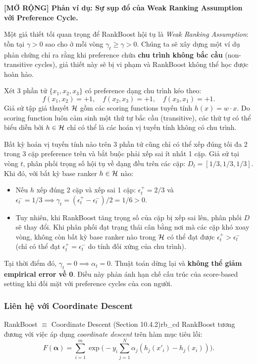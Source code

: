 \begin{morong}
\textbf{[MỞ RỘNG] Phản ví dụ: Sự sụp đổ của Weak Ranking Assumption với Preference Cycle.}

Một giả thiết tối quan trọng để RankBoost hội tụ là \textit{Weak Ranking Assumption}: tồn tại $\gamma > 0$ sao cho ở mỗi vòng $\gamma_t \geq \gamma > 0$. Chúng ta sẽ xây dựng một ví dụ phản chứng chỉ ra rằng khi preference chứa \textbf{chu trình không bắc cầu} (non-transitive cycles), giả thiết này sẽ bị vi phạm và RankBoost không thể học được hoàn hảo.

Xét 3 phần tử $\{x_1, x_2, x_3\}$ có preference dạng chu trình kéo theo:
\[
    f(x_1, x_2) = +1, \quad f(x_2, x_3) = +1, \quad f(x_3, x_1) = +1.
\]
Giả sử tập giả thuyết $\mathcal{H}$ gồm các scoring functions tuyến tính $h(x) = w \cdot x$. Do scoring function luôn cảm sinh một thứ tự bắc cầu (transitive), các thứ tự có thể biểu diễn bởi $h \in \mathcal{H}$ chỉ có thể là các hoán vị tuyến tính không có chu trình. 

Bất kỳ hoán vị tuyến tính nào trên 3 phần tử cũng chỉ có thể xếp đúng tối đa 2 trong 3 cặp preference trên và bắt buộc phải xếp sai ít nhất 1 cặp.
Giả sử tại vòng $t$, phân phối trọng số hội tụ về dạng đều trên các cặp: $D_t = [1/3, 1/3, 1/3]$. Khi đó, với bất kỳ base ranker $h \in \mathcal{H}$ nào:
\begin{itemize}
    \item Nếu $h$ xếp đúng 2 cặp và xếp sai 1 cặp: $\epsilon^+_t = 2/3$ và $\epsilon^-_t = 1/3 \implies \gamma_t = (\epsilon^+_t - \epsilon^-_t)/2 = 1/6 > 0$.
    \item Tuy nhiên, khi RankBoost tăng trọng số của cặp bị xếp sai lên, phân phối $D$ sẽ thay đổi. Khi phân phối đạt trạng thái cân bằng nơi mà các cặp khó xoay vòng, không còn bất kỳ base ranker nào trong $\mathcal{H}$ có thể đạt được $\epsilon^+_t > \epsilon^-_t$ (chỉ có thể đạt $\epsilon^+_t = \epsilon^-_t$ do tính đối xứng của chu trình).
\end{itemize}
Tại thời điểm đó, $\gamma_t = 0 \implies \alpha_t = 0$. Thuật toán dừng lại và \textbf{không thể giảm empirical error về 0}. Điều này phản ánh hạn chế cấu trúc của score-based setting khi đối mặt với preference cycles của con người.
\end{morong}

\subsubsection{Liên hệ với Coordinate Descent}

\begin{theorem}{RankBoost $\equiv$ Coordinate Descent (Section 10.4.2)}{rb_cd}
RankBoost tương đương với việc áp dụng \textit{coordinate descent} trên hàm mục tiêu lồi:
\begin{equation}
    F(\bm{\alpha}) = \sum_{i=1}^m \exp\Biggl(-y_i \sum_{j=1}^N \alpha_j (h_j(x'_i) - h_j(x_i))\Biggr).
    \label{eq:F_obj}
\end{equation}
\end{theorem}

